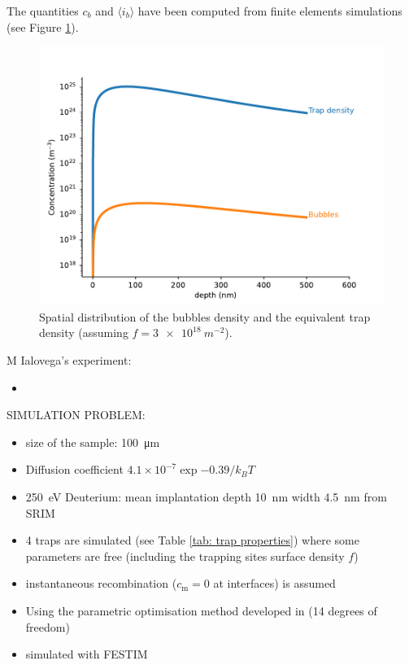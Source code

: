 The quantities $c_b$ and $\langle i_b \rangle$ have been computed from finite elements simulations \cite{delaporte-mathurin_influence_2021} (see Figure \ref{fig:trap bubbles distribution}).

\begin{figure}[h!]
    \centering
    \includegraphics[width=\linewidth]{Figures/Chapter5/trap_bubble_distribution.pdf}
    \caption{Spatial distribution of the bubbles density and the equivalent trap density (assuming $f=\SI{3e18}{m^{-2}}$).}
    \label{fig:trap bubbles distribution}
\end{figure}

M Ialovega's experiment:
\begin{itemize}
    \item \cite{ialovega_hydrogen_2020}
\end{itemize}


SIMULATION PROBLEM:
\begin{itemize}
    \item size of the sample: \SI{100}{\micro\metre}
    \item Diffusion coefficient $4.1\times 10 ^{-7} \exp{-0.39/k_B T}$ \cite{frauenfelder_solution_1969}
    \item  \SI{250}{eV} Deuterium: mean implantation depth \SI{10}{nm} width \SI{4.5}{nm} from SRIM \cite{ziegler_srim_2010}
    \item 4 traps are simulated (see Table \ref{tab: trap properties}) where some parameters are free (including the trapping sites surface density $f$)
    \item instantaneous recombination ($c_\mathrm{m} = 0$ at interfaces) is assumed
    \item Using the parametric optimisation method developed in \cite{delaporte-mathurin_parametric_2021} (14 degrees of freedom)
    \item simulated with FESTIM \cite{delaporte-mathurin_finite_2019}
\end{itemize} 

